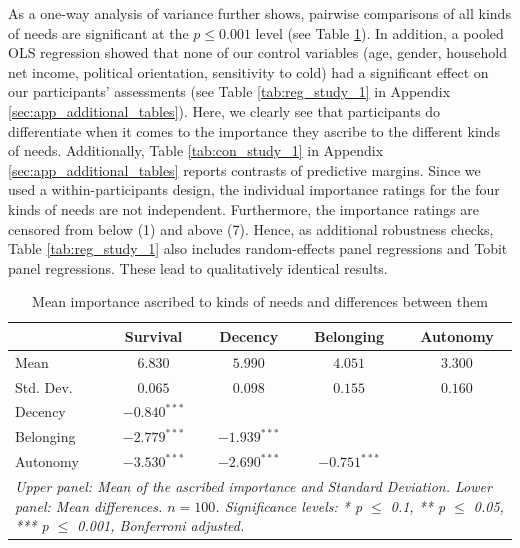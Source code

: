 \documentclass[egregdoesnotlikesansseriftitles]{scrartcl}
\begin{document}
As a one-way analysis of variance further shows, pairwise comparisons of all kinds of needs are significant at the $p \le 0.001$ level (see Table \ref{tab:study_1_anova}).
In addition, a pooled OLS regression showed that none of our control variables (age, gender, household net income, political orientation, sensitivity to cold) had a significant effect on our participants' assessments (see Table \ref{tab:reg_study_1} in Appendix \ref{sec:app_additional_tables}).
Here, we clearly see that participants do differentiate when it comes to the importance they ascribe to the different kinds of needs.
Additionally, Table \ref{tab:con_study_1} in Appendix \ref{sec:app_additional_tables} reports contrasts of predictive margins.
Since we used a within-participants design, the individual importance ratings for the four kinds of needs are not independent.
Furthermore, the importance ratings are censored from below (1) and above (7).
Hence, as additional robustness checks, Table \ref{tab:reg_study_1} also includes random-effects panel regressions and Tobit panel regressions.
These lead to qualitatively identical results.

\begin{table}[ht!]
   \centering
   \caption{Mean importance ascribed to kinds of needs and differences between them}\label{tab:study_1_anova}
   \begin{tabular}{lcccc}\\[0.5ex]
   \hline
                & Survival         & Decency          & Belonging        & Autonomy   \\
   \hline
   Mean         & $ 6.830$         & $ 5.990$         & $ 4.051$         & $3.300$    \\
   Std. Dev.    & $ 0.065$         & $ 0.098$         & $ 0.155$         & $0.160$    \\
   \hline\hline
   Decency      & $-0.840^{***}$   &                  &                  &            \\
   Belonging    & $-2.779^{***}$   & $-1.939^{***}$   &                  &            \\
   Autonomy     & $-3.530^{***}$   & $-2.690^{***}$   & $-0.751^{***}$   &            \\
   \hline
   \multicolumn{5}{p{10.5cm}}{\footnotesize{\textit{Upper panel: Mean of the ascribed importance and Standard Deviation. Lower panel: Mean differences. $n = 100$. Significance levels: * p $\le$ 0.1, ** p $\le$ 0.05, *** p $\le$ 0.001, Bonferroni adjusted.}}}
   \end{tabular}
\end{table}
\end{document}
